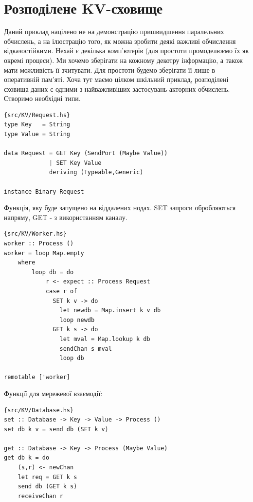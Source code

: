 \documentclass[12pt]{article}
\begin{document}
\section{Розподілене KV-сховище}

Даний приклад націлено не на демонстрацію пришвидшення паралельних обчислень, а на 
ілюстрацію того, як можна зробити деякі важливі обчислення відказостійкими. Нехай є
декілька комп'ютерів (для простоти промоделюємо їх як окремі процеси). Ми хочемо зберігати 
на кожному декотру інформацію, а також мати можливість її зчитувати. Для простоти
будемо зберігати її лише в оперативній пам'яті. Хоча тут маємо цілком шкільний приклад,
розподілені сховища даних є одними з найважливіших застосувань акторних обчислень.\\

Створимо необхідні типи.\\

\begin{lstlisting}{src/KV/Request.hs}
type Key   = String
type Value = String

data Request = GET Key (SendPort (Maybe Value))
             | SET Key Value
             deriving (Typeable,Generic)

instance Binary Request
\end{lstlisting}

Функція, яку буде запущено на віддалених нодах. SET запроси обробляються напряму, 
GET - з використанням каналу.\\

\begin{lstlisting}{src/KV/Worker.hs}
worker :: Process ()
worker = loop Map.empty
    where
        loop db = do
            r <- expect :: Process Request
            case r of
              SET k v -> do
                let newdb = Map.insert k v db
                loop newdb
              GET k s -> do
                let mval = Map.lookup k db
                sendChan s mval
                loop db
                    
remotable ['worker]
\end{lstlisting}

Функції для мережевої взаємодії:

\begin{lstlisting}{src/KV/Database.hs}
set :: Database -> Key -> Value -> Process ()
set db k v = send db (SET k v)

get :: Database -> Key -> Process (Maybe Value)
get db k = do
    (s,r) <- newChan 
    let req = GET k s 
    send db (GET k s)
    receiveChan r 
\end{lstlisting}
\end{document}
